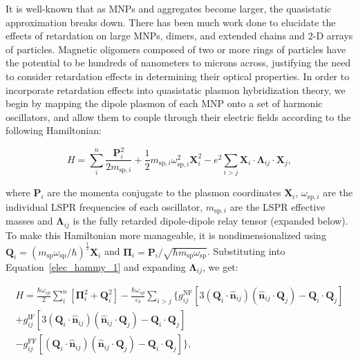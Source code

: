 \documentclass[journal=apchd5,manuscript=article]{achemso}
\begin{document}
It is well-known that as MNPs and aggregates become larger, the quasistatic approximation breaks down. There has been much work done to elucidate the effects of retardation on large MNPs\cite{Abajo2008,Gu2010}, dimers\cite{vonPlessen2007,Rechbacher2003,Kottman2001}, and extended chains and 2-D arrays of particles\cite{Schatz2003,Royer2005,Chumanov2010,Pinchuk2016}. Magnetic oligomers composed of two or more rings of particles have the potential to be hundreds of nanometers to microns across, justifying the need to consider retardation effects in determining their optical properties. In order to incorporate retardation effects into quasistatic plasmon hybridization theory, we begin by mapping the dipole plasmon of each MNP onto a set of harmonic oscillators, and allow them to couple through their electric fields according to the following Hamiltonian\cite{Cherqui2014}:

\begin{equation}
H = \sum_{i}^{n}\frac{\textbf{P}_{i}^{2}}{2m_{\textrm{sp},i}} + \frac{1}{2}m_{\textrm{sp},i}\omega_{\textrm{sp},i}^2\textbf{X}_{i}^{2} - e^2\sum_{i>j}\textbf{X}_i\cdot\boldsymbol{\Lambda}_{ij}\cdot\textbf{X}_j,\label{elec_hammy_1}
\end{equation}

\noindent where $\textbf{P}_i$ are the momenta conjugate to the plasmon coordinates $\textbf{X}_{i}$, $\omega_{\textrm{sp},i}$ are the individual LSPR frequencies of each oscillator, $m_{\textrm{sp},i}$ are the LSPR effective masses and $\boldsymbol{\Lambda}_{ij}$ is the fully retarded dipole-dipole relay tensor (expanded below)\cite{jackson_classical_1999}. To make this Hamiltonian more manageable, it is nondimensionalized using $\textbf{Q}_i = \left(m_{\textrm{sp}}\omega_{\textrm{sp}}/\hbar\right)^{\frac{1}{2}}\textbf{X}_i$ and $\boldsymbol{\Pi}_i = \textbf{P}_i/\sqrt{\hbar m_{\textrm{sp}}\omega_{\textrm{sp}}}$. Substituting into Equation~\ref{elec_hammy_1} and expanding $\boldsymbol{\Lambda}_{ij}$, we get:

\begin{equation}
\begin{aligned}
H = 
\frac{\hbar\omega_{sp}}{2}\sum_{i}^{n}[\boldsymbol{\Pi}_i^2 + \textbf{Q}_i^2] - \frac{\hbar\omega_{sp}}{\varepsilon_b}\sum_{i>j}\{g_{ij}^{\textrm{NF}}\left[3(\textbf{Q}_i\cdot\hat{\textbf{n}}_{ij})(\hat{\textbf{n}}_{ij}\cdot\textbf{Q}_j) - \textbf{Q}_i\cdot\textbf{Q}_j\right] \\
+ g_{ij}^{\textrm{IF}}\left[3(\textbf{Q}_i\cdot\hat{\textbf{n}}_{ij})(\hat{\textbf{n}}_{ij}\cdot\textbf{Q}_j) -\textbf{Q}_i\cdot\textbf{Q}_j\right] \\ 
- g_{ij}^{\textrm{FF}}\left[(\textbf{Q}_i\cdot\hat{\textbf{n}}_{ij})(\hat{\textbf{n}}_{ij}\cdot\textbf{Q}_j) -\textbf{Q}_i\cdot\textbf{Q}_j\right]\},\label{elec_hammy_2}
\end{aligned}
\end{equation}
\end{document}
